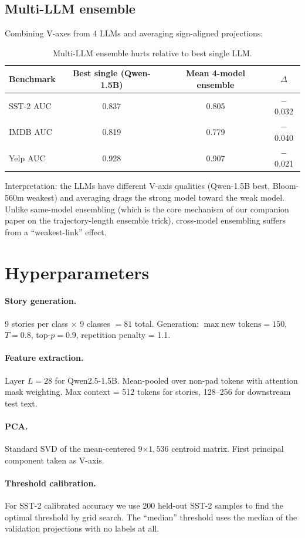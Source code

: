 \subsection{Multi-LLM ensemble}
Combining V-axes from 4 LLMs and averaging sign-aligned projections:

\begin{table}[h]
\centering
\caption{Multi-LLM ensemble hurts relative to best single LLM.}
\label{tab:sup_multillm}
\begin{tabular}{lccc}
\toprule
Benchmark & Best single (Qwen-1.5B) & Mean 4-model ensemble & $\Delta$ \\
\midrule
SST-2 AUC & 0.837 & 0.805 & $-$0.032 \\
IMDB AUC & 0.819 & 0.779 & $-$0.040 \\
Yelp AUC & 0.928 & 0.907 & $-$0.021 \\
\bottomrule
\end{tabular}
\end{table}

Interpretation: the LLMs have different V-axis qualities (Qwen-1.5B best,
Bloom-560m weakest) and averaging drags the strong model toward the weak
model. Unlike same-model ensembling (which is the core mechanism of our
companion paper on the trajectory-length ensemble trick), cross-model
ensembling suffers from a ``weakest-link'' effect.

\section{Hyperparameters}
\label{sup:hparams}

\paragraph{Story generation.} 9 stories per class $\times$ 9 classes $= 81$
total. Generation: $\max\text{new tokens}=150$, $T=0.8$, top-$p=0.9$,
repetition penalty = 1.1.

\paragraph{Feature extraction.} Layer $L=28$ for Qwen2.5-1.5B.
Mean-pooled over non-pad tokens with attention mask weighting.
Max context = 512 tokens for stories, 128--256 for downstream test text.

\paragraph{PCA.} Standard SVD of the mean-centered 9$\times 1{,}536$
centroid matrix. First principal component taken as V-axis.

\paragraph{Threshold calibration.} For SST-2 calibrated accuracy we use
200 held-out SST-2 samples to find the optimal threshold by grid search.
The ``median'' threshold uses the median of the validation projections
with no labels at all.
